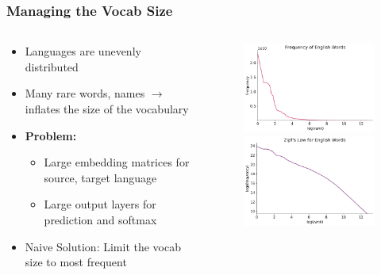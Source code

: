 \documentclass[usenames,dvipsnames]{beamer}
\begin{document}
\begin{frame}
\frametitle{Managing the Vocab Size}
\begin{columns}
  \begin{column}{0.45\textwidth}
    \begin{itemize}
      \item Languages are unevenly distributed
      \item Many rare words, names $\rightarrow$ inflates the size of the vocabulary
      \item \textbf{Problem:}
      \begin{itemize}
        \item Large embedding matrices for source, target language
        \item Large output layers for prediction and softmax
      \end{itemize}
      \item Naive Solution: Limit the vocab size to most frequent
    \end{itemize}
  \end{column}
  \begin{column}{0.45\textwidth}
    \begin{figure}
      \centering
      \includegraphics[width=4.5cm, valign=c]{assets/zipf}
      \vspace{5mm}
      \includegraphics[width=4.5cm, valign=c]{assets/zipf_log}
    \end{figure}
  \end{column}
\end{columns}
\end{frame}
\end{document}
